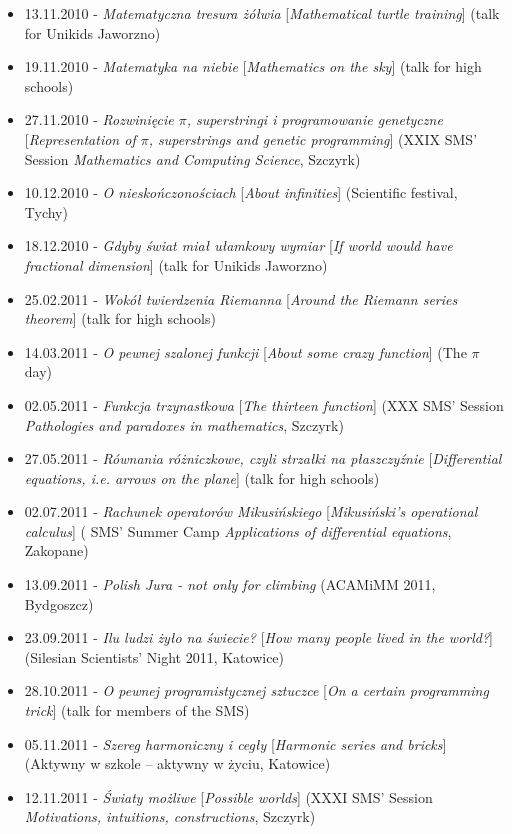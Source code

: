 \begin{itemize}
  \item 13.11.2010 - \textsl{Matematyczna tresura żółwia} [\textsl{Mathematical turtle training}] (talk for Unikids Jaworzno)
  \item 19.11.2010 - \textsl{Matematyka na niebie} [\textsl{Mathematics on the sky}] (talk for high schools)
  \item 27.11.2010 - \textsl{Rozwinięcie $\pi$, superstringi i programowanie genetyczne} [\textsl{Representation of $\pi$, superstrings and genetic programming}] (XXIX SMS' Session \textsl{Mathematics and Computing Science}, Szczyrk)
  \item 10.12.2010 - \textsl{O nieskończonościach} [\textsl{About infinities}] (Scientific festival, Tychy)
  \item 18.12.2010 - \textsl{Gdyby świat miał ułamkowy wymiar} [\textsl{If world would have fractional dimension}] (talk for Unikids Jaworzno)
  \item 25.02.2011 - \textsl{Wokół twierdzenia Riemanna} [\textsl{Around the Riemann series theorem}] (talk for high schools)
  \item 14.03.2011 - \textsl{O pewnej szalonej funkcji} [\textsl{About some crazy function}] (The $\pi$ day)
  \item 02.05.2011 - \textsl{Funkcja trzynastkowa} [\textsl{The thirteen function}] (XXX SMS' Session \textsl{Pathologies and paradoxes in mathematics}, Szczyrk)
  \item 27.05.2011 - \textsl{Równania różniczkowe, czyli strzałki na płaszczyźnie} [\textsl{Differential equations, i.e. arrows on the plane}] (talk for high schools)
  \item 02.07.2011 - \textsl{Rachunek operatorów Mikusińskiego} [\textsl{Mikusiński's operational calculus}] ( SMS' Summer Camp \textsl{Applications of differential equations}, Zakopane)
  \item 13.09.2011 - \textsl{Polish Jura - not only for climbing} (ACAMiMM 2011, Bydgoszcz)
  \item 23.09.2011 - \textsl{Ilu ludzi żyło na świecie?} [\textsl{How many people lived in the world?}] (Silesian Scientists' Night 2011, Katowice)
  \item 28.10.2011 - \textsl{O pewnej programistycznej sztuczce} [\textsl{On a certain programming trick}] (talk for members of the SMS)
  \item 05.11.2011 - \textsl{Szereg harmoniczny i cegły} [\textsl{Harmonic series and bricks}] (Aktywny w szkole -- aktywny w życiu, Katowice)
  \item 12.11.2011 - \textsl{Światy możliwe} [\textsl{Possible worlds}] (XXXI SMS' Session \textsl{Motivations, intuitions, constructions}, Szczyrk)

\end{itemize}
